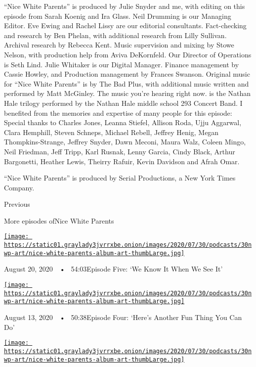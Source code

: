 ``Nice White Parents'' is produced by Julie Snyder and me, with editing
on this episode from Sarah Koenig and Ira Glass. Neil Drumming is our
Managing Editor. Eve Ewing and Rachel Lissy are our editorial
consultants. Fact-checking and research by Ben Phelan, with additional
research from Lilly Sullivan. Archival research by Rebecca Kent. Music
supervision and mixing by Stowe Nelson, with production help from Aviva
DeKornfeld. Our Director of Operations is Seth Lind. Julie Whitaker is
our Digital Manager. Finance management by Cassie Howley, and Production
management by Frances Swanson. Original music for ``Nice White Parents''
is by The Bad Plus, with additional music written and performed by Matt
McGinley. The music you're hearing right now. is the Nathan Hale trilogy
performed by the Nathan Hale middle school 293 Concert Band. I benefited
from the memories and expertise of many people for this episode: Special
thanks to Charles Jones, Leanna Stiefel, Allison Roda, Ujju Aggarwal,
Clara Hemphill, Steven Schneps, Michael Rebell, Jeffrey Henig, Megan
Thompkins-Strange, Jeffrey Snyder, Dawn Meconi, Maura Walz, Coleen
Mingo, Neil Friedman, Jeff Tripp, Karl Rusnak, Lenny Garcia, Cindy
Black, Arthur Bargonetti, Heather Lewis, Theirry Rafuir, Kevin Davidson
and Afrah Omar.

``Nice White Parents'' is produced by Serial Productions, a New York
Times Company.

Previous

More episodes ofNice White Parents

\href{https://www.nytimes3xbfgragh.onion/2020/08/20/podcasts/nice-white-parents-school.html?action=click\&module=audio-series-bar\&region=header\&pgtype=Article}{\texttt{[image: https://static01.graylady3jvrrxbe.onion/images/2020/07/30/podcasts/30nwp-art/nice-white-parents-album-art-thumbLarge.jpg]}}

August 20, 2020~~•~ 54:03Episode Five: `We Know It When We See It'

\href{https://www.nytimes3xbfgragh.onion/2020/08/13/podcasts/nice-white-parents-school.html?action=click\&module=audio-series-bar\&region=header\&pgtype=Article}{\texttt{[image: https://static01.graylady3jvrrxbe.onion/images/2020/07/30/podcasts/30nwp-art/nice-white-parents-album-art-thumbLarge.jpg]}}

August 13, 2020~~•~ 50:38Episode Four: `Here's Another Fun Thing You Can
Do'

\href{https://www.nytimes3xbfgragh.onion/2020/08/06/podcasts/episode-three-this-is-our-school-how-dare-you.html?action=click\&module=audio-series-bar\&region=header\&pgtype=Article}{\texttt{[image: https://static01.graylady3jvrrxbe.onion/images/2020/07/30/podcasts/30nwp-art/nice-white-parents-album-art-thumbLarge.jpg]}}

